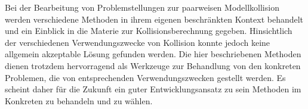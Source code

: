 
Bei der Bearbeitung von Problemstellungen zur paarweisen Modellkollision werden verschiedene Methoden in ihrem eigenen beschränkten Kontext behandelt und ein Einblick in die Materie zur Kollisionsberechnung gegeben. Hinsichtlich der verschiedenen Verwendungszwecke von Kollision konnte jedoch keine allgemein akzeptable Lösung gefunden werden. Die hier beschriebenen Methoden dienen trotzdem hervorragend als Werkzeuge zur Behandlung von den konkreten Problemen, die von entsprechenden Verwendungszwecken gestellt werden. Es scheint daher für die Zukunft ein guter Entwicklungsansatz zu sein Methoden im Konkreten zu behandeln und zu wählen.
